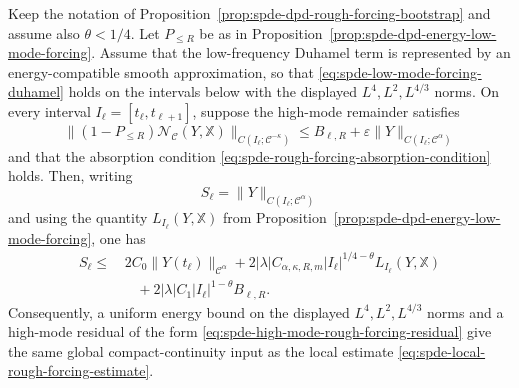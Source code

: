 \begin{corollary}
\label{cor:spde-dpd-low-high-rough-forcing-input}
Keep the notation of
Proposition~\ref{prop:spde-dpd-rough-forcing-bootstrap} and assume also
\(\theta<1/4\).  Let \(P_{\leq R}\) be as in
Proposition~\ref{prop:spde-dpd-energy-low-mode-forcing}.  Assume that the
low-frequency Duhamel term is represented by an energy-compatible smooth
approximation, so that
\eqref{eq:spde-low-mode-forcing-duhamel} holds on the intervals below with
the displayed \(L^4,L^2,L^{4/3}\) norms.  On every interval
\(I_\ell=[t_\ell,t_{\ell+1}]\), suppose the high-mode remainder satisfies
\begin{equation}
  \|(1-P_{\leq R})\mathcal N_{\mathcal C}(Y,\mathbb X)\|_
    {C(I_\ell;\mathcal C^{-\kappa})}
  \leq
  B_{\ell,R}
  +\varepsilon\|Y\|_{C(I_\ell;\mathcal C^\alpha)}
  \label{eq:spde-high-mode-rough-forcing-residual}
\end{equation}
and that the absorption condition
\eqref{eq:spde-rough-forcing-absorption-condition} holds.  Then, writing
\[
  S_\ell=\|Y\|_{C(I_\ell;\mathcal C^\alpha)}
\]
and using the quantity \(L_{I_\ell}(Y,\mathbb X)\) from
Proposition~\ref{prop:spde-dpd-energy-low-mode-forcing}, one has
\begin{equation}
\begin{aligned}
  S_\ell
  \leq
  &\,2C_0\|Y(t_\ell)\|_{\mathcal C^\alpha}
  +2|\lambda|C_{\alpha,\kappa,R,m}
      |I_\ell|^{1/4-\theta}L_{I_\ell}(Y,\mathbb X)
\\
  &\quad
  +2|\lambda|C_1|I_\ell|^{1-\theta}B_{\ell,R}.
\end{aligned}
  \label{eq:spde-low-high-rough-forcing-single-step}
\end{equation}
Consequently, a uniform energy bound on the displayed \(L^4,L^2,L^{4/3}\)
norms and a high-mode residual of the form
\eqref{eq:spde-high-mode-rough-forcing-residual} give the same global
compact-continuity input as the local estimate
\eqref{eq:spde-local-rough-forcing-estimate}.
\end{corollary}

